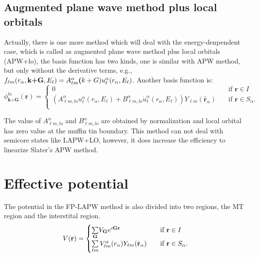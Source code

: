 \documentclass[a4paper, 12pt, titlepage,oneside,drop]{kthesis}
\begin{document}
\subsection{Augmented plane wave method plus local orbitals}
\noindent Actually, there is one more method which will deal with the energy-denpendent case, which is called as augmented plane wave method plus local orbitals (APW+lo), the 
basis function has two kinds, one is similar with APW method, but only without the derivative terms, e.g., $f_{{\ell}{m}} (r_{\alpha},\textbf{k+G} ,E_{\ell}) =  A _{{\ell}m}^{\alpha} \textbf(k+G) u_{{\ell}}^{\alpha}(r_{\alpha}, E_{\ell})$.
Another basis function is:
\begin{equation}\label{lap6}
\phi^{lo}_\textbf{k+G} (\textbf{r})= 
\begin{cases} 0 & \quad \mbox{if $\textbf{r} \in I $}
\\
(A _{{\ell}m,lo}^{\alpha}  u_{{\ell}}^{\alpha}(r_{\alpha}, E_{\ell}) + B _{{\ell}m,lo}^{\alpha}  \dot{u}_{{\ell}}^{\alpha}(r_{\alpha}, E_{\ell}) ){Y_{{\ell}m}(\hat{\textbf{r}}_{\alpha})} & \quad \mbox{if $\textbf{r} \in S_\alpha. $}\\ 
\end{cases}
\end{equation}
 
\noindent The value of $A _{{\ell}m,lo}^{\alpha}$ and $B _{{\ell}m,lo}^{\alpha}$ are obtained by normalization and local orbital has zero value at the muffin tin boundary. This method can not deal with semicore states like LAPW+LO, 
however, it does increase the efficiency to linearize Slater's APW method.

\section{Effective potential}

The potential in the FP-LAPW method is also divided into two regions, the MT region and the interstital region.
\begin{equation*}\label{lap7}
V(\textbf{r})= 
\begin{cases} \sumg<{\textbf G}> V_{\textbf G} e^{i {\textbf G} {\textbf {r}  }} & \quad \mbox{if $\textbf{r} \in I $}
\\
 \sum\limits_{{\ell}m} V_{{\ell}m}^{\alpha} (r_{\alpha}) Y_{{\ell}m}(\hat{{\textbf r}}_{\alpha})  & \quad \mbox{if $\textbf{r} \in S_\alpha. $}\\ 
\end{cases}
\end{equation*}
\end{document}
